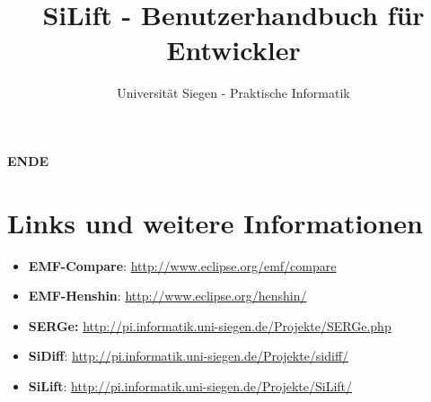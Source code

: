 \documentclass[a4paper]{scrartcl}
\begin{document}
\title{SiLift - Benutzerhandbuch für Entwickler}
\author{Universität Siegen - Praktische Informatik}


\maketitle



\newpage

\tableofcontents
\newpage
















\begin{center}
\textbf{ENDE}
\end{center}

\newpage

\section{Links und weitere Informationen}

\begin{itemize}
\item \textbf{EMF-Compare}: \url{http://www.eclipse.org/emf/compare}
\item \textbf{EMF-Henshin}: \url{http://www.eclipse.org/henshin/}
\item \textbf{SERGe:} \url{http://pi.informatik.uni-siegen.de/Projekte/SERGe.php}
\item \textbf{SiDiff}: \url{http://pi.informatik.uni-siegen.de/Projekte/sidiff/}
\item \textbf{SiLift}: \url{http://pi.informatik.uni-siegen.de/Projekte/SiLift/}
\end{itemize} 
\end{document}
